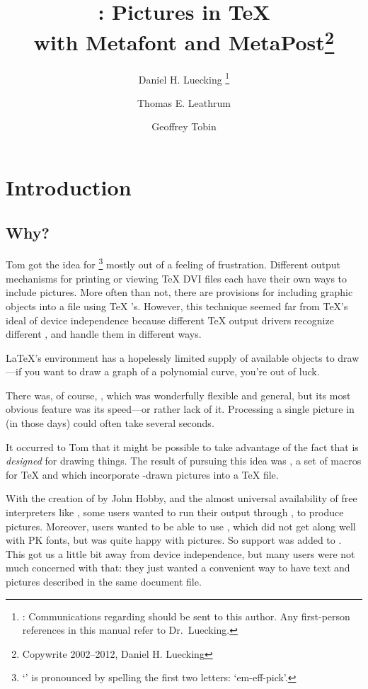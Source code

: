 \documentclass[letterpaper]{article}
\title{\Mfp{}: Pictures in \TeX{}\\ with Metafont and
MetaPost\thanks{Copywrite 2002--2012, Daniel H. Luecking}}
\author{%
Daniel H. Luecking%
    \thanks{\email {luecking@uark.edu}: Communications regarding \mfp{}
    should be sent to this author. Any first-person references in this
    manual refer to Dr.~Luecking.}
\and Thomas E. Leathrum
\and Geoffrey Tobin}
\date{\mfpfiledate}
\begin{document}
\maketitle
\tableofcontents

\clearpage
{}

\chapter{Introduction}\label{introduction}
\thispagestyle{plain}


\section{Why?}\label{why}

Tom got the idea for \mfp{}%
    \footnote{`\Mfp{}' is pronounced by spelling the first two letters:
    `em-eff-pick'.}
mostly out of a feeling of frustration. Different output mechanisms for
printing or viewing \TeX{} DVI files each have their own ways to include
pictures.  More often than not, there are provisions for including
graphic objects into a  file using \TeX{} 's.
However, this technique seemed far from \TeX{}'s ideal of device
independence because different \TeX{} output drivers recognize different
, and handle them in different ways.

\LaTeX{}'s  environment has a hopelessly limited supply of
available objects to draw---if you want to draw a graph of a polynomial
curve, you're out of luck.

There was, of course, \PiCTeX{}, which was wonderfully flexible and
general, but its most obvious feature was its speed---or rather lack of
it. Processing a single picture in \PiCTeX{} (in those days) could often
take several seconds.

It occurred to Tom that it might be possible to take advantage of the
fact that \MF{} is \emph{designed} for drawing things. The result of
pursuing this idea was \mfp{}, a set of macros for \TeX{} and
\MF{} which incorporate \MF{}-drawn pictures into a \TeX{} file.

With the creation of \MP{} by John Hobby, and the almost universal
availability of free \PS{} interpreters like \GS, some \mfp{} users
wanted to run their \mfp{} output through \MP{}, to produce \PS{}
pictures. Moreover, users wanted to be able to use \pdfTeX{}, which did
not get along well with PK fonts, but was quite happy with \MP{}
pictures. So \MP{} support was added to \mfp{}. This got us a little bit
away from device independence, but many users were not much concerned
with that: they just wanted a convenient way to have text and pictures
described in the same document file.
\end{document}
